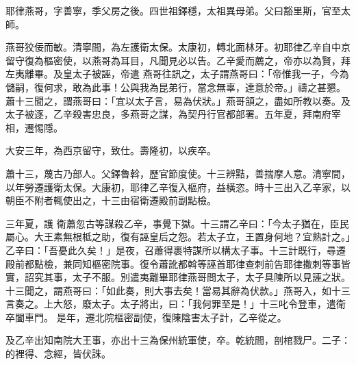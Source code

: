 \begin{pinyinscope}
 耶律燕哥，字善寧，季父房之後。四世祖鐸穩，太祖異母弟。父曰豁里斯，官至太師。



 燕哥狡佞而敏。清寧間，為左護衛太保。太康初，轉北面林牙。初耶律乙辛自中京留守復為樞密使，以燕哥為耳目，凡聞見必以告。乙辛愛而薦之，帝亦以為賢，拜左夷離畢。及皇太子被誣，帝遣
 燕哥往訊之，太子謂燕哥曰：「帝惟我一子，今為儲嗣，復何求，敢為此事！公與我為昆弟行，當念無辜，達意於帝。」禱之甚懇。蕭十三聞之，謂燕哥曰：「宜以太子言，易為伏狀。」燕哥頷之，盡如所教以奏。及太子被逐，乙辛殺害忠良，多燕哥之謀，為契丹行官都部署。五年夏，拜南府宰相，遷惕隱。



 大安三年，為西京留守，致仕。壽隆初，以疾卒。



 蕭十三，蔑古乃部人。父鐸魯斡，歷官節度使。十三辨黠，善揣摩人意。清寧間，以年勞遷護衛太保。大康初，耶律乙辛復入樞府，益橫恣。時十三出入乙辛家，以朝臣不附者輒使出之，十三由宿衛遷殿前副點檢。



 三年夏，護
 衛蕭忽古等謀殺乙辛，事覺下獄。十三謂乙辛曰：「今太子猶在，臣民屬心。大王素無根柢之助，復有誣皇后之怨。若太子立，王置身何地？宜熟計之。」乙辛曰：「吾憂此久矣！」是夜，召蕭得裹特謀所以構太子事。十三計既行，尋遷殿前都點檢，兼同知樞密院事。復令蕭訛都斡等誣首耶律查刺前告耶律撒刺等事皆實，詔究其事，太子不服。別遣夷離畢耶律燕哥問太子，太子具陳所以見誣之狀。十三聞之，謂燕哥曰：「如此奏，則大事去矣！當易其辭為伏款。」燕哥入，如十三言奏之。上大怒，廢太子。太子將出，曰：「我何罪至是！」十三叱令登車，遣衛卒闔車門。
 是年，遷北院樞密副使，復陳陰害太子計，乙辛從之。



 及乙辛出知南院大王事，亦出十三為保州統軍使，卒。乾統間，剖棺戮尸。二子：的裡得、念經，皆伏誅。



\end{pinyinscope}